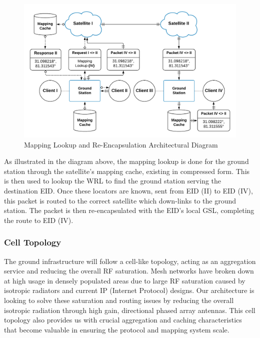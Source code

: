 \documentclass[11pt]{article}
\begin{document}
\begin{figure}[h]
    \centering
    \includegraphics[width=1\textwidth]{./images/rsz_re_encapsulating.png}
    \caption{Mapping Lookup and Re-Encapsulation Architectural Diagram}
\end{figure}

\begin{center}

\end{center}

\noindent As illustrated in the diagram above, the mapping lookup is done for the ground station through the satellite's mapping cache, existing in compressed form.
This is then used to lookup the WRL to find the ground station serving the destination EID.
Once these locators are known, sent from EID (II) to EID (IV), this packet is routed to the correct satellite which down-links to the ground station.
The packet is then re-encapsulated with the EID's local GSL, completing the route to EID (IV).


\subsubsection{Cell Topology}
\label{3.4.3}

The ground infrastructure will follow a cell-like topology, acting as an aggregation service and reducing the overall RF saturation.
Mesh networks have broken down at high usage in densely populated areas due to large RF saturation caused by isotropic radiators and current IP (Internet Protocol) designs.
Our architecture is looking to solve these saturation and routing issues by reducing the overall isotropic radiation through high gain, directional phased array antennas. 
This cell topology also provides us with crucial aggregation and caching characteristics that become valuable in ensuring the protocol and mapping system scale.
\end{document}
